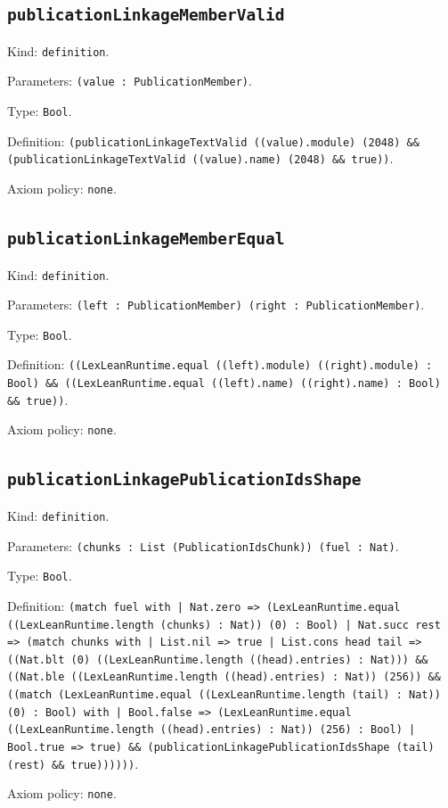 \documentclass[11pt]{article}
\begin{document}
\subsection*{\texttt{publicationLinkageMemberValid}}
\noindent Kind: \texttt{definition}.\par
\noindent Parameters: \texttt{(value : PublicationMember)}.\par
\noindent Type: \texttt{Bool}.\par
\noindent Definition: \texttt{(publicationLinkageTextValid ((value).module) (2048) \&\& (publicationLinkageTextValid ((value).name) (2048) \&\& true))}.\par
\noindent Axiom policy: \texttt{none}.\par
\subsection*{\texttt{publicationLinkageMemberEqual}}
\noindent Kind: \texttt{definition}.\par
\noindent Parameters: \texttt{(left : PublicationMember) (right : PublicationMember)}.\par
\noindent Type: \texttt{Bool}.\par
\noindent Definition: \texttt{((LexLeanRuntime.equal ((left).module) ((right).module) : Bool) \&\& ((LexLeanRuntime.equal ((left).name) ((right).name) : Bool) \&\& true))}.\par
\noindent Axiom policy: \texttt{none}.\par
\subsection*{\texttt{publicationLinkagePublicationIdsShape}}
\noindent Kind: \texttt{definition}.\par
\noindent Parameters: \texttt{(chunks : List (PublicationIdsChunk)) (fuel : Nat)}.\par
\noindent Type: \texttt{Bool}.\par
\noindent Definition: \texttt{(match fuel with | Nat.zero => (LexLeanRuntime.equal ((LexLeanRuntime.length (chunks) : Nat)) (0) : Bool) | Nat.succ rest => (match chunks with | List.nil => true | List.cons head tail => ((Nat.blt (0) ((LexLeanRuntime.length ((head).entries) : Nat))) \&\& ((Nat.ble ((LexLeanRuntime.length ((head).entries) : Nat)) (256)) \&\& ((match (LexLeanRuntime.equal ((LexLeanRuntime.length (tail) : Nat)) (0) : Bool) with | Bool.false => (LexLeanRuntime.equal ((LexLeanRuntime.length ((head).entries) : Nat)) (256) : Bool) | Bool.true => true) \&\& (publicationLinkagePublicationIdsShape (tail) (rest) \&\& true))))))}.\par
\noindent Axiom policy: \texttt{none}.\par
\end{document}
